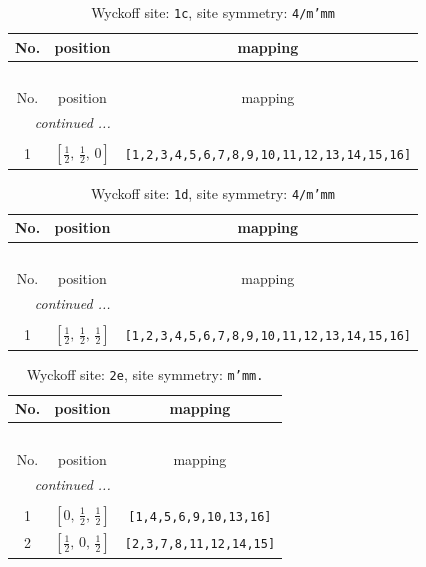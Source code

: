 \documentclass[fleqn,8pt]{jsarticle}
\begin{document}
\begin{longtable}{ccc}
\caption{Wyckoff site: {\tt 1c}, site symmetry: {\tt 4/m'mm}}
 \\
 \hline \hline
No. & position & mapping \\ \hline \endfirsthead

\multicolumn{2}{l}{\tablename\ \thetable{}} \\
 \hline \hline
No. & position & mapping \\ \hline \endhead

 \hline \hline
\multicolumn{2}{r}{\footnotesize\it continued ...} \\ \endfoot

 \hline \hline
\multicolumn{2}{r}{} \\ \endlastfoot

1 & $\left[ \frac{1}{2},\, \frac{1}{2},\, 0 \right]$ & {\tt [1,2,3,4,5,6,7,8,9,10,11,12,13,14,15,16]} \\
\end{longtable}
\renewcommand{\arraystretch}{1.2}
\begin{longtable}{ccc}
\caption{Wyckoff site: {\tt 1d}, site symmetry: {\tt 4/m'mm}}
 \\
 \hline \hline
No. & position & mapping \\ \hline \endfirsthead

\multicolumn{2}{l}{\tablename\ \thetable{}} \\
 \hline \hline
No. & position & mapping \\ \hline \endhead

 \hline \hline
\multicolumn{2}{r}{\footnotesize\it continued ...} \\ \endfoot

 \hline \hline
\multicolumn{2}{r}{} \\ \endlastfoot

1 & $\left[ \frac{1}{2},\, \frac{1}{2},\, \frac{1}{2} \right]$ & {\tt [1,2,3,4,5,6,7,8,9,10,11,12,13,14,15,16]} \\
\end{longtable}
\renewcommand{\arraystretch}{1.2}
\begin{longtable}{ccc}
\caption{Wyckoff site: {\tt 2e}, site symmetry: {\tt m'mm.}}
 \\
 \hline \hline
No. & position & mapping \\ \hline \endfirsthead

\multicolumn{2}{l}{\tablename\ \thetable{}} \\
 \hline \hline
No. & position & mapping \\ \hline \endhead

 \hline \hline
\multicolumn{2}{r}{\footnotesize\it continued ...} \\ \endfoot

 \hline \hline
\multicolumn{2}{r}{} \\ \endlastfoot

1 & $\left[ 0,\, \frac{1}{2},\, \frac{1}{2} \right]$ & {\tt [1,4,5,6,9,10,13,16]} \\ \hline
2 & $\left[ \frac{1}{2},\, 0,\, \frac{1}{2} \right]$ & {\tt [2,3,7,8,11,12,14,15]} \\
\end{longtable}
\end{document}
